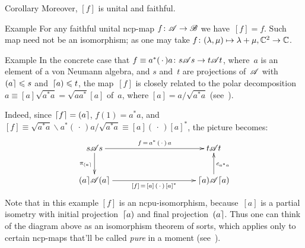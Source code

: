 \documentclass[a]{subfiles}
\begin{document}
\begin{parsec}
\begin{point}[square-f]{Corollary}
Moreover, 
$[f]$ is unital and faithful.
\end{point}
\begin{point}{Example}%
For any faithful unital ncp-map $f\colon \mathscr{A}\to \mathscr{B}$
we have~$[f]=f$.
Such map need not be an isomorphism;
as one may take $f\colon (\lambda,\mu)\mapsto \lambda+\mu,
\mathbb{C}^2\to\mathbb{C}$.
\end{point}
\begin{point}[ad-pure]{Example}%
In the concrete case
that $f\equiv a^*(\,\cdot\,)a \colon
s\mathscr{A} s\to t\mathscr{A} t$,
where~$a$ is an element
of a von Neumann algebra,
and $s$ and~$t$ are projections of~$\mathscr{A}$
with
$\left(a\right\rceil\leqslant s$
and~$\left\lceil a\right)\leqslant t$,
the map~$[f]$ 
is closely related to the
polar decomposition $a\equiv [a]\sqrt{a^*a}
= \sqrt{aa^*}[a]$ of~$a$,
where $[a]=a/\sqrt{a^*a}$
(see~).

Indeed,
since  $\left\lceil f\right\rceil=\left(a\right\rceil$,
$f(1)=a^*a$,
and~$[f]\equiv \sqrt{a^*a}\backslash a^*(\,\cdot\,)a/\sqrt{a^*a}
\equiv [a](\,\cdot\,)[a]^*$,
the picture becomes:
\begin{equation*}
\xymatrix@C=10em{
s\scrA s
\ar[r]^-{f\,=\,a^*\,(\,\cdot\,)\,a}
\ar[d]_{\pi_{\ceilr{a}}}
&
t\scrA t
\\
\ceilr{a}\!\scrA\!\ceilr{a}
\ar[r]_-{[f] \,=\,  [a]\,(\,\cdot\,)\,[a]^*}
& 
\ceill{a}\!\scrA\!\ceill{a}
\ar[u]_{c_{a^*a}}
}
\end{equation*}
Note that in this example
$[f]$ is an ncpu-isomorphism,
because~$[a]$ is a partial isometry
with initial projection~$\left\lceil a\right)$
and final projection~$\left(a\right\rceil$.
Thus one can think of the diagram above
as an isomorphism theorem of sorts,
which applies only to certain  ncp-maps
that'll be called \emph{pure} in a moment (see~).
\end{point}
\end{parsec}
\end{document}
